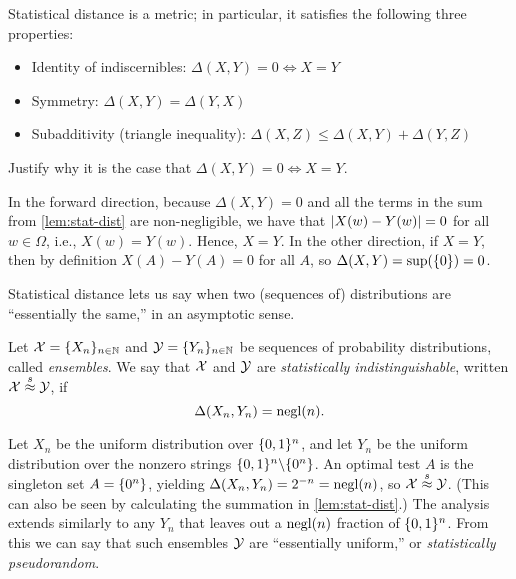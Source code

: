 \documentclass[11pt]{article}
\begin{document}
\begin{lemma}
  Statistical distance is a metric; in particular, it satisfies the
  following three properties:
  \begin{itemize}
  \item Identity of indiscernibles: $\Delta(X,Y) = 0 \iff X = Y$
  \item Symmetry: $\Delta(X,Y) = \Delta(Y,X)$
  \item Subadditivity (triangle inequality):
    $\Delta(X,Z) \leq \Delta(X,Y) + \Delta(Y, Z)$
  \end{itemize}
\end{lemma}

\begin{question}
  Justify why it is the case that $\Delta(X,Y) = 0 \iff X = Y$.
\end{question}

\begin{answer}
  In the forward direction, because $\Delta(X,Y) = 0$ and all the
  terms in the sum from \cref{lem:stat-dist} are non-negligible,
  we have that $\lvert X(w) - Y(w)\rvert = 0$ for all $w \in \Omega$, i.e.,
  $X(w) = Y(w)$. Hence, $X = Y$. In the other direction, if $X = Y$,
  then by definition $X(A) - Y(A) = 0$ for all $A$, so
  $\Delta(X,Y) = \sup(\{0\}) = 0$.
\end{answer}

Statistical distance lets us say when two (sequences of) distributions
are ``essentially the same,'' in an asymptotic sense.

\begin{definition}
  \label{def:stat-ind}
  Let $\mathcal{X} = \{X_{n}\}_{n \in \mathbb{N}}$ and
  $\mathcal{Y} = \{Y_{n}\}_{n \in \mathbb{N}}$ be sequences of probability
  distributions, called \emph{ensembles}.  We say that $\mathcal{X}$ and
  $\mathcal{Y}$ are \emph{statistically indistinguishable}, written
  $\mathcal{X} \stackrel{s}{\approx} \mathcal{Y}$, if \[ \Delta(X_{n}, Y_{n}) = \operatorname{negl}(n). \]
\end{definition}

\begin{example}
  Let $X_{n}$ be the uniform distribution over $\{0,1\}^{n}$, and let
  $Y_{n}$ be the uniform distribution over the nonzero strings
  $\{0,1\}^{n} \backslash \{0^{n}\}$.  An optimal test $A$ is the
  singleton set $A = \{0^{n}\}$, yielding
  $\Delta(X_{n}, Y_{n}) = 2^{-n} = \operatorname{negl}(n)$, so
  $\mathcal{X} \stackrel{s}{\approx} \mathcal{Y}$.  (This can also be seen by calculating the
  summation in \cref{lem:stat-dist}.)  The analysis extends
  similarly to any $Y_{n}$ that leaves out a $\operatorname{negl}(n)$ fraction of
  $\{0,1\}^{n}$.  From this we can say that such ensembles $\mathcal{Y}$ are
  ``essentially uniform,'' or \emph{statistically pseudorandom}.
\end{example}
\end{document}
